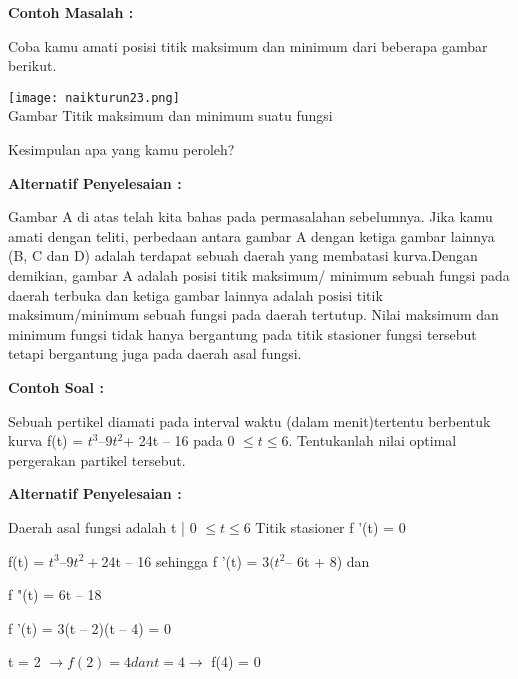 \documentclass[11pt,fleqn]{book} %
\begin{document}
\begin{flushleft}
\textbf{Contoh Masalah :}

Coba kamu amati posisi titik maksimum dan minimum
dari beberapa gambar berikut.
\end{flushleft}

\begin{center}
\texttt{[image: naikturun23.png]}\\
Gambar Titik maksimum dan minimum suatu fungsi
\end{center}

\begin{flushleft}
Kesimpulan apa yang kamu peroleh?
\end{flushleft}

\begin{flushleft}
\textbf{Alternatif Penyelesaian :}
\end{flushleft}

Gambar A di atas telah kita bahas pada permasalahan
sebelumnya. Jika kamu amati dengan teliti, perbedaan antara gambar A dengan ketiga gambar lainnya (B, C dan D) adalah terdapat sebuah daerah yang membatasi kurva.Dengan demikian, gambar A adalah posisi titik maksimum/ minimum sebuah fungsi pada daerah terbuka dan ketiga gambar lainnya adalah posisi titik maksimum/minimum sebuah fungsi pada daerah tertutup. Nilai maksimum dan minimum fungsi tidak hanya bergantung pada titik stasioner fungsi tersebut tetapi bergantung juga pada daerah asal fungsi.


\begin{flushleft}
\textbf{Contoh Soal :}
\end{flushleft}

Sebuah pertikel diamati pada interval waktu (dalam menit)tertentu berbentuk kurva f(t) = $t^{3} – 9t^{2} $+ 24t – 16 pada 0 $\leq t \leq 6.$ Tentukanlah nilai optimal pergerakan partikel tersebut.

\begin{flushleft}
\textbf{Alternatif Penyelesaian :}
\end{flushleft}

Daerah asal fungsi adalah {t | 0 $\leq t \leq $6} Titik stasioner
f '(t) = 0

f(t) = $t^{3} – 9t^{2} + $24t – 16 sehingga f '(t) = 3$(t^{2} $– 6t + 8) dan

f "(t) = 6t – 18

f '(t) = 3(t – 2)(t – 4) = 0

t = 2 $\rightarrow f (2) = 4 dan t = 4 \rightarrow$ f(4) = 0
\end{document}

